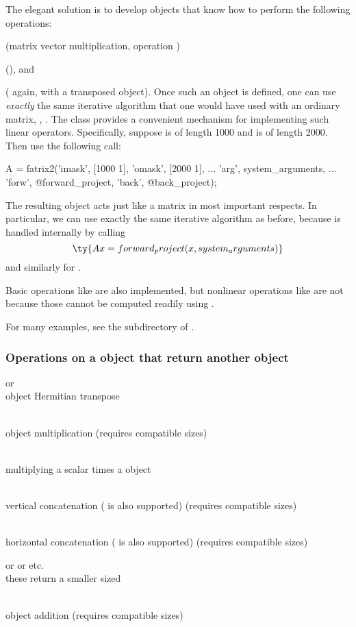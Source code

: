 The elegant solution
is to develop \matlab objects
that know how to perform
the following operations:
\blist
\item
{}
(matrix vector multiplication,
operation )
\item
{}
(), and
\item
{}
( again,
with a transposed object).
\elist
Once such an object is
defined,
one can use \emph{exactly}
the same iterative algorithm
that one would have used
with an ordinary matrix,
\eg,
.
%
The \fatrixx class
provides a convenient mechanism
for implementing
such linear operators.
%
Specifically,
suppose \x is of length 1000
and \y is of length 2000.
Then use the following call:
\begin{verbatimtab}
A = fatrix2('imask', [1000 1], 'omask', [2000 1], ...
	'arg', system_arguments, ...
	'forw', @forward_project, 'back', @back_project);
\end{verbatimtab}
The resulting \fatrixx object 
acts just like a matrix
in most important respects.
In particular,
we can use exactly the same iterative algorithm
 as before,
because
is handled internally
by calling
\[
\ty{
Ax = forward_project(x, system_arguments)
}
\]
and similarly for
.

Basic operations
like 
are also implemented,
but nonlinear operations
like 
are not
because those cannot be computed readily
using . 

For many examples, see
the  subdirectory of \irt.

\subsubsection
{
Operations on a \fatrixx object
that return another \fatrixx object
}

\blist
\item
{} or 
\\
\fatrixx object Hermitian transpose
\item
{}
\\
\fatrixx object multiplication
(requires compatible sizes)
\item
{}
\\
multiplying a scalar times a \fatrixx object
\item
{}
\\
vertical concatenation ( is also supported)
(requires compatible sizes)
\item
{}
\\
horizontal concatenation ( is also supported) %
(requires compatible sizes)
\item
{} or  or  etc.
\\
these return a smaller sized \fatrixx
\item
{}
\\
\fatrixx object addition
(requires compatible sizes)
\elist


